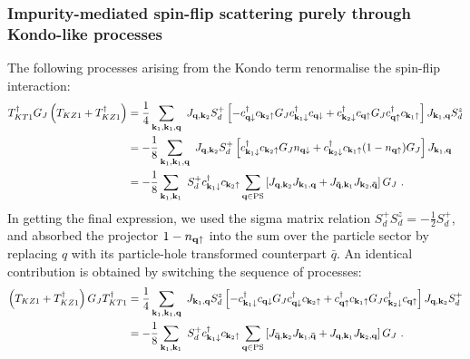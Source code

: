 \documentclass[reprint,hidelinks]{revtex4-2}
\begin{document}
\begin{widetext}
\subsubsection*{Impurity-mediated spin-flip scattering purely through Kondo-like processes}
The following processes arising from the Kondo term renormalise the spin-flip interaction:
\begin{equation}\begin{aligned}\label{kondoRenorm1}
	T^\dagger_{KT1} G_J \left(T_{KZ1} + T_{KZ1}^\dagger\right) &= \frac{1}{4}\sum_{{\bf k}_1, {\bf k}_1, {\bf q}}~J_{{\bf q}, {\bf k}_2} S_d^+ \left[-c^\dagger_{{\bf q}\downarrow} c_{{\bf k}_2 \uparrow} G_J c^\dagger_{{\bf k}_1 \downarrow} c_{{\bf q} \downarrow} + c^\dagger_{{\bf k}_2\downarrow} c_{{\bf q} \uparrow} G_J c^\dagger_{{\bf q}\uparrow} c_{{\bf k}_1 \uparrow}\right]J_{{\bf k}_1,{\bf q}} S_d^z\\
								&= -\frac{1}{8}\sum_{{\bf k}_1, {\bf k}_1, {\bf q}}~J_{{\bf q}, {\bf k}_2} S_d^+ \left[ c^\dagger_{{\bf k}_1 \downarrow}c_{{\bf k}_2 \uparrow} G_J n_{{\bf q} \downarrow} + c^\dagger_{{\bf k}_2\downarrow} c_{{\bf k}_1 \uparrow}(1 - n_{{\bf q} \uparrow}) G_J \right]J_{{\bf k}_1,{\bf q}}\\
								&= -\frac{1}{8}\sum_{{\bf k}_1, {\bf k}_1}~ S_d^+ c^\dagger_{{\bf k}_1 \downarrow}c_{{\bf k}_2 \uparrow}\sum_{{\bf q} \in \text{PS}}\left[J_{{\bf q}, {\bf k}_2} J_{{\bf k}_1,{\bf q}} + J_{{\bf \bar q}, {\bf k}_1} J_{{\bf k}_2,{\bf \bar q}} \right]G_J~.
\end{aligned}\end{equation}
In getting the final expression, we used the sigma matrix relation \(S_d^+ S_d^z = -\frac{1}{2}S_d^+\), and absorbed the projector \(1 - n_{{\bf q} \uparrow}\) into the sum over the particle sector by replacing \(q\) with its particle-hole transformed counterpart \(\bar q\). An identical contribution is obtained by switching the sequence of processes:
\begin{equation}\begin{aligned}\label{kondoRenorm2}
	 \left(T_{KZ1} + T_{KZ1}^\dagger\right) G_J T^\dagger_{KT1} &= \frac{1}{4}\sum_{{\bf k}_1, {\bf k}_1, {\bf q}}~J_{{\bf k}_1,{\bf q}} S_d^z\left[- c^\dagger_{{\bf k}_1 \downarrow} c_{{\bf q} \downarrow}G_J c^\dagger_{{\bf q}\downarrow} c_{{\bf k}_2 \uparrow} +c^\dagger_{{\bf q}\uparrow} c_{{\bf k}_1 \uparrow} G_J c^\dagger_{{\bf k}_2\downarrow} c_{{\bf q} \uparrow} \right] J_{{\bf q}, {\bf k}_2} S_d^+ \\
								&= -\frac{1}{8}\sum_{{\bf k}_1, {\bf k}_1}~ S_d^+ c^\dagger_{{\bf k}_1 \downarrow}c_{{\bf k}_2 \uparrow}\sum_{{\bf q} \in \text{PS}}\left[J_{{\bf \bar q}, {\bf k}_2} J_{{\bf k}_1,{\bf \bar q}} + J_{{\bf q}, {\bf k}_1} J_{{\bf k}_2,{\bf q}} \right]G_J~.
\end{aligned}\end{equation}


\end{widetext}
\end{document}
